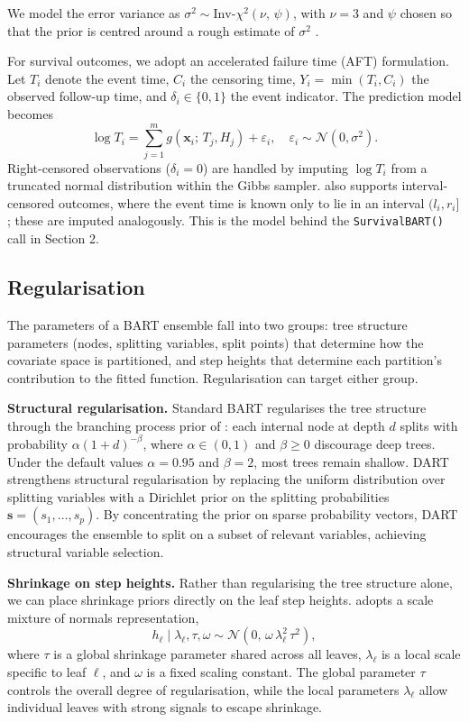 We model the error variance as \(\sigma^2 \sim \text{Inv-}\chi^2(\nu,\, \psi)\), with \(\nu = 3\) and \(\psi\) chosen so that the prior is centred around a rough estimate of \(\sigma^2\) \citep{chipman2010bart}.

For survival outcomes, we adopt an accelerated failure time (AFT) formulation. Let \(T_i\) denote the event time, \(C_i\) the censoring time, \(Y_i = \min(T_i, C_i)\) the observed follow-up time, and \(\delta_i \in \{0, 1\}\) the event indicator. The prediction model becomes
\[
\log T_i = \sum_{j=1}^{m} g(\mathbf{x}_i;\, T_j, H_j) + \varepsilon_i, \quad \varepsilon_i \sim \mathcal{N}(0, \sigma^2).
\]
Right-censored observations (\(\delta_i = 0\)) are handled by imputing \(\log T_i\) from a truncated normal distribution within the Gibbs sampler.  also supports interval-censored outcomes, where the event time is known only to lie in an interval \((l_i, r_i]\); these are imputed analogously. This is the model behind the \texttt{SurvivalBART()} call in Section 2.

\subsection{Regularisation}\label{regularisation}

The parameters of a BART ensemble fall into two groups: tree structure parameters (nodes, splitting variables, split points) that determine how the covariate space is partitioned, and step heights that determine each partition's contribution to the fitted function. Regularisation can target either group.

\textbf{Structural regularisation.} Standard BART regularises the tree structure through the branching process prior of \citet{chipman2010bart}: each internal node at depth \(d\) splits with probability \(\alpha (1 + d)^{-\beta}\), where \(\alpha \in (0,1)\) and \(\beta \geq 0\) discourage deep trees. Under the default values \(\alpha = 0.95\) and \(\beta = 2\), most trees remain shallow. DART \citep{linero2018dart} strengthens structural regularisation by replacing the uniform distribution over splitting variables with a Dirichlet prior on the splitting probabilities \(\mathbf{s} = (s_1, \ldots, s_p)\). By concentrating the prior on sparse probability vectors, DART encourages the ensemble to split on a subset of relevant variables, achieving structural variable selection.

\textbf{Shrinkage on step heights.} Rather than regularising the tree structure alone, we can place shrinkage priors directly on the leaf step heights.  adopts a scale mixture of normals representation,
\[
h_\ell \mid \lambda_\ell, \tau, \omega \sim \mathcal{N}(0,\, \omega\, \lambda_\ell^2\, \tau^2),
\]
where \(\tau\) is a global shrinkage parameter shared across all leaves, \(\lambda_\ell\) is a local scale specific to leaf \(\ell\), and \(\omega\) is a fixed scaling constant. The global parameter \(\tau\) controls the overall degree of regularisation, while the local parameters \(\lambda_\ell\) allow individual leaves with strong signals to escape shrinkage.

